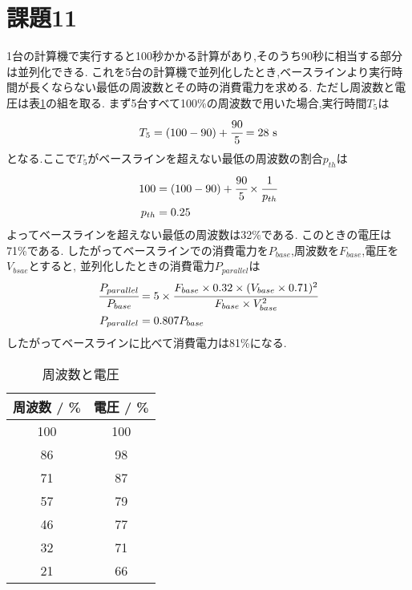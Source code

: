 \section{課題11}
1台の計算機で実行すると100秒かかる計算があり,そのうち90秒に相当する部分は並列化できる.
これを5台の計算機で並列化したとき,ベースラインより実行時間が長くならない最低の周波数とその時の消費電力を求める.
ただし周波数と電圧は表\ref{tab:q11}の組を取る.
まず5台すべて100\%の周波数で用いた場合,実行時間$T_5$は
\begin{align*}
  T_5=(100-90)+\cfrac{90}{5}=28~\si{\second}
\end{align*}
となる.ここで$T_5$がベースラインを超えない最低の周波数の割合$p_{th}$は
\begin{align*}
  100&=(100-90)+\cfrac{90}{5}\times \cfrac{1}{p_{th}}\\
  p_{th}&=0.25
\end{align*}
よってベースラインを超えない最低の周波数は32\%である.
このときの電圧は71\%である.
したがってベースラインでの消費電力を$P_{base}$,周波数を$F_{base}$,電圧を$V_{bsae}$とすると,
並列化したときの消費電力$P_{parallel}$は
\begin{align*}
  \cfrac{P_{parallel}}{P_{base}}&=5\times\cfrac{F_{base}\times0.32\times(V_{base}\times0.71)^2}{F_{base}\times{V_{base}^2}}\\
  P_{parallel}&=0.807P_{base}
\end{align*}
したがってベースラインに比べて消費電力は81\%になる.
\begin{table}[htbp]
\caption{周波数と電圧}
\label{tab:q11}
\centering
\begin{tabular}{cc}
\hline
周波数 / \%&電圧 / \%\\
\hline \hline
100&100\\
86&98\\
71&87\\
57&79\\
46&77\\
32&71\\
21&66\\
\hline
\end{tabular}
\end{table}